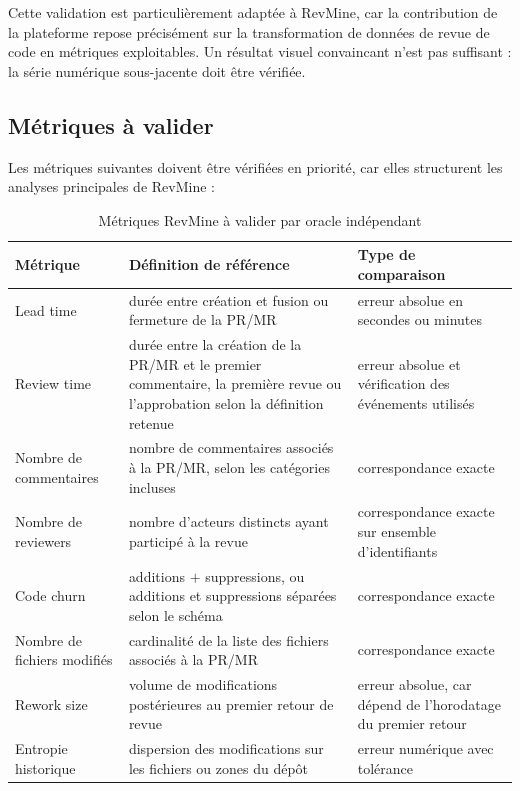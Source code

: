 Cette validation est particulièrement adaptée à RevMine, car la contribution de la plateforme repose précisément sur la transformation de données de revue de code en métriques exploitables. Un résultat visuel convaincant n'est pas suffisant : la série numérique sous-jacente doit être vérifiée.

\subsection{Métriques à valider}
\label{subsec:metriques-a-valider}

Les métriques suivantes doivent être vérifiées en priorité, car elles structurent les analyses principales de RevMine :

\begin{table}[H]
\centering
\small
\caption{Métriques RevMine à valider par oracle indépendant}
\label{tab:metriques-oracle-validation}
\begin{tabularx}{\textwidth}{|p{3.2cm}|X|X|}
\hline
\textbf{Métrique} & \textbf{Définition de référence} & \textbf{Type de comparaison} \\
\hline
Lead time & durée entre création et fusion ou fermeture de la PR/MR & erreur absolue en secondes ou minutes \\
\hline
Review time & durée entre la création de la PR/MR et le premier commentaire, la première revue ou l'approbation selon la définition retenue & erreur absolue et vérification des événements utilisés \\
\hline
Nombre de commentaires & nombre de commentaires associés à la PR/MR, selon les catégories incluses & correspondance exacte \\
\hline
Nombre de reviewers & nombre d'acteurs distincts ayant participé à la revue & correspondance exacte sur ensemble d'identifiants \\
\hline
Code churn & additions $+$ suppressions, ou additions et suppressions séparées selon le schéma & correspondance exacte \\
\hline
Nombre de fichiers modifiés & cardinalité de la liste des fichiers associés à la PR/MR & correspondance exacte \\
\hline
Rework size & volume de modifications postérieures au premier retour de revue & erreur absolue, car dépend de l'horodatage du premier retour \\
\hline
Entropie historique & dispersion des modifications sur les fichiers ou zones du dépôt & erreur numérique avec tolérance \\
\hline
\end{tabularx}
\end{table}

